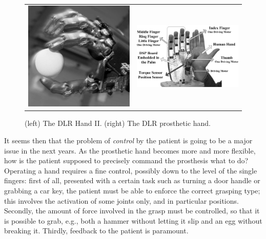 \begin{figure}
  \begin{tabular}{cc}
    \includegraphics[height=0.12\textheight]{figs/DLRHand-Ball-comp.eps} &
    \includegraphics[height=0.12\textheight]{figs/DLR-Prothese.eps}
  \end{tabular}
  \caption{(left) The DLR Hand II. (right) The DLR prosthetic hand.}
  \label{fig:DLRHandII}
\end{figure}

It seems then that the problem of \emph{control} by the patient is
going to be a major issue in the next years. As the prosthetic hand
becomes more and more flexible, how is the patient supposed to
precisely command the prosthesis what to do? Operating a hand requires
a fine control, possibly down to the level of the single fingers:
first of all, presented with a certain task such as turning a door
handle or grabbing a car key, the patient must be able to enforce the
correct grasping type; this involves the activation of some joints
only, and in particular positions. Secondly, the amount of force
involved in the grasp must be controlled, so that it is possible to
grab, e.g., both a hammer without letting it slip and an egg without
breaking it. Thirdly, feedback to the patient is paramount.


